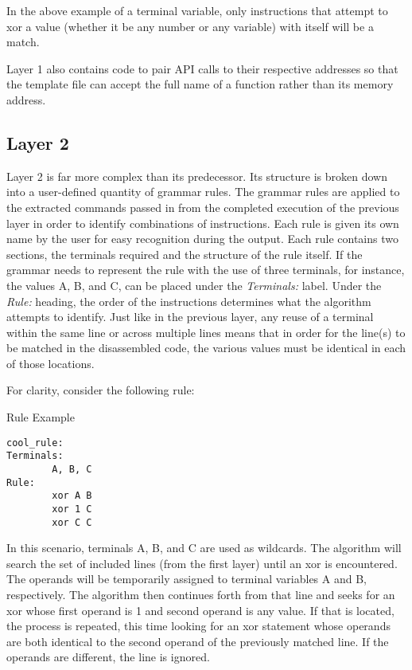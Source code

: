 \documentclass{article}
\begin{document}
In the above example of a terminal variable, only instructions that attempt to xor a value (whether it be any number or any variable) with itself
will be a match.

Layer 1 also contains code to pair API calls to their respective addresses so that the template file can accept the full name of a function rather than its memory address.    

\subsection*{Layer 2}
Layer 2 is far more complex than its predecessor. Its structure is broken down into a user-defined quantity of grammar rules.  The grammar rules are applied to the
extracted commands passed in from the completed execution of the previous layer in order to identify combinations of instructions. Each rule is given its own name by the user for easy recognition during the output.  
Each rule contains two sections, the terminals required and the structure of the rule itself.  If the grammar needs to represent the rule with the use of three terminals, for instance, the values A, B, and C, can be placed 
under the \emph{Terminals:} label. Under the \emph{Rule:} heading, the order of the instructions determines what the algorithm attempts to identify. 
Just like in the previous layer, any reuse of a terminal within the same line or across multiple lines means that in order for the line(s) to be matched in the disassembled code,
the various values must be identical in each of those locations.

For clarity, consider the following rule:

\begin{algorithm}
\lstset{language=[mips]Assembler}
\caption{Rule Example}
\begin{lstlisting}
cool_rule:
Terminals:
        A, B, C
Rule:
        xor A B
        xor 1 C
        xor C C
\end{lstlisting}
\end{algorithm}

In this scenario, terminals A, B, and C are used as wildcards.  The algorithm will search the set of included lines (from the first layer) until
an xor is encountered.  The operands will be temporarily assigned to terminal variables A and B, respectively.  The algorithm then continues forth from that line and seeks for an xor whose first operand is 1 and second operand is any value.  If that is located,
the process is repeated, this time looking for an xor statement whose operands are both identical to the second operand of the previously matched line.
If the operands are different, the line is ignored.  
\end{document}
